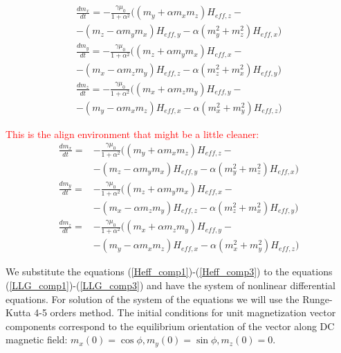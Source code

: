 \documentclass[preprint,superscriptaddress]{revtex4}
\begin{document}
\begin{eqnarray}
\frac{d m_x}{dt}=-\frac{\gamma\mu_0}{1+\alpha^{2}}
((m_y+\alpha m_x m_z) H_{eff,z}-\nonumber\\
- (m_z - \alpha m_y m_x)  H_{eff,y}- \alpha (m_y^2+m_z^2)  H_{eff,x}) \label{LLG_comp1}
\\
\frac{d m_y}{dt}=-\frac{\gamma\mu_0}{1+\alpha^{2}}
((m_z+\alpha m_y m_x) H_{eff,x}-\nonumber\\
- (m_x - \alpha m_z m_y)  H_{eff,z}- \alpha (m_z^2+m_x^2)  H_{eff,y}) \label{LLG_comp2}
\\
\frac{d m_z}{dt}=-\frac{\gamma\mu_0}{1+\alpha^{2}}
((m_x+\alpha m_z m_y) H_{eff,y}-\nonumber\\
- (m_y - \alpha m_x m_z)  H_{eff,x}- \alpha (m_x^2+m_y^2)  H_{eff,z}) \label{LLG_comp3}
\,
\end{eqnarray}

\textcolor{red}{This is the align environment that might be a little cleaner:}
\begin{align}
\frac{d m_x}{dt}=&-\frac{\gamma\mu_0}{1+\alpha^{2}}
((m_y+\alpha m_x m_z) H_{eff,z}-\nonumber\\
&- (m_z - \alpha m_y m_x)  H_{eff,y}- \alpha (m_y^2+m_z^2)  H_{eff,x}) \label{LLG_comp1}
\\
\frac{d m_y}{dt}=&-\frac{\gamma\mu_0}{1+\alpha^{2}}
((m_z+\alpha m_y m_x) H_{eff,x}-\nonumber\\
&- (m_x - \alpha m_z m_y)  H_{eff,z}- \alpha (m_z^2+m_x^2)  H_{eff,y}) \label{LLG_comp2}
\\
\frac{d m_z}{dt}=&-\frac{\gamma\mu_0}{1+\alpha^{2}}
((m_x+\alpha m_z m_y) H_{eff,y}-\nonumber\\
&- (m_y - \alpha m_x m_z)  H_{eff,x}- \alpha (m_x^2+m_y^2)  H_{eff,z}) \label{LLG_comp3}
\
\end{align}


We substitute the equations (\ref{Heff_comp1})-(\ref{Heff_comp3}) to the equations (\ref{LLG_comp1})-(\ref{LLG_comp3}) 
and have the system of nonlinear differential equations. For solution of the system of the equations we will use 
the Runge-Kutta 4-5 orders method.
The initial conditions for unit magnetization vector components correspond to the equilibrium orientation 
of the vector along DC magnetic field: $m_x(0)=\cos\phi, m_y(0)=\sin\phi, m_z(0)=0.$




\end{document}
